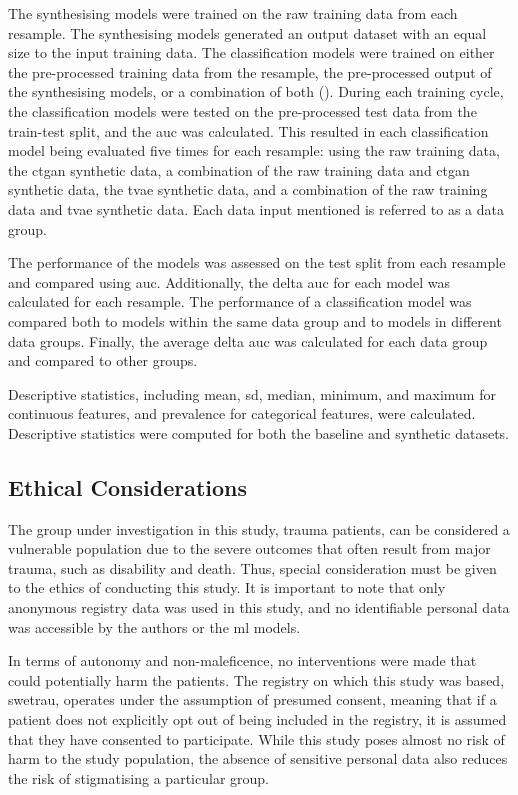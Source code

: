 \documentclass[12pt, letterpaper]{article}
\begin{document}
The synthesising models were trained on the raw training data from each resample. The synthesising models generated an output dataset with an equal size to the input training data. The classification models were trained on either the pre-processed training data from the resample, the pre-processed output of the synthesising models, or a combination of both (). During each training cycle, the classification models were tested on the pre-processed test data from the train-test split, and the \acrshort{auc} was calculated. This resulted in each classification model being evaluated five times for each resample: using the raw training data, the \acrshort{ctgan} synthetic data, a combination of the raw training data and \acrshort{ctgan} synthetic data, the \acrshort{tvae} synthetic data, and a combination of the raw training data and \acrshort{tvae} synthetic data. Each data input mentioned is referred to as a data group.

The performance of the models was assessed on the test split from each resample and compared using \acrshort{auc}. Additionally, the delta \acrshort{auc} for each model was calculated for each resample. The performance of a classification model was compared both to models within the same data group and to models in different data groups. Finally, the average delta \acrshort{auc} was calculated for each data group and compared to other groups.

Descriptive statistics, including mean, \acrfull{sd}, median, minimum, and maximum for continuous features, and prevalence for categorical features, were calculated. Descriptive statistics were computed for both the baseline and synthetic datasets.

\subsection{Ethical Considerations}
The group under investigation in this study, trauma patients, can be considered a vulnerable population due to the severe outcomes that often result from major trauma, such as disability and death. Thus, special consideration must be given to the ethics of conducting this study. It is important to note that only anonymous registry data was used in this study, and no identifiable personal data was accessible by the authors or the \acrshort{ml} models.

In terms of autonomy and non-maleficence, no interventions were made that could potentially harm the patients. The registry on which this study was based, \acrshort{swetrau}, operates under the assumption of presumed consent, meaning that if a patient does not explicitly opt out of being included in the registry, it is assumed that they have consented to participate. While this study poses almost no risk of harm to the study population, the absence of sensitive personal data also reduces the risk of stigmatising a particular group.
\end{document}
